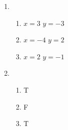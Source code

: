 \documentclass{article}
\begin{document}
\begin{enumerate}
\item
 \begin{enumerate}
  \item $x=3$  $y= -3$
  \item $x=-4$   $y=2$
  \item $x=2$  $y=-1$
 \end{enumerate}

\item
 \begin{enumerate}
  \item T
  \item F
  \item T
 \end{enumerate}



\end{enumerate}
\end{document}
